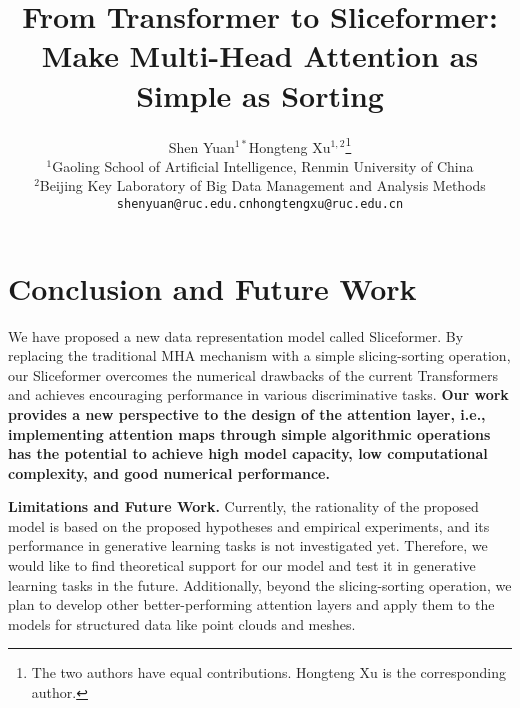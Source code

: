 \documentclass{article}
\title{From Transformer to Sliceformer: \\Make Multi-Head Attention as Simple as Sorting}
\author{Shen Yuan$^{1*}$\quad Hongteng Xu$^{1,2}$\thanks{The two authors have equal contributions. Hongteng Xu is the corresponding author.} \\
$^1$Gaoling School of Artificial Intelligence, Renmin University of China\\
$^2$Beijing Key Laboratory of Big Data Management and Analysis Methods\\
\texttt{shenyuan@ruc.edu.cn}\quad \texttt{hongtengxu@ruc.edu.cn}\\
}
\begin{document}
\maketitle











\section{Conclusion and Future Work}
We have proposed a new data representation model called Sliceformer. 
By replacing the traditional MHA mechanism with a simple slicing-sorting operation, our Sliceformer overcomes the numerical drawbacks of the current Transformers and achieves encouraging performance in various discriminative tasks. 
\textbf{Our work provides a new perspective to the design of the attention layer, i.e., implementing attention maps through simple algorithmic operations has the potential to achieve high model capacity, low computational complexity, and good numerical performance.} 

\textbf{Limitations and Future Work.} 
Currently, the rationality of the proposed model is based on the proposed hypotheses and empirical experiments, and its performance in generative learning tasks is not investigated yet.
Therefore, we would like to find theoretical support for our model and test it in generative learning tasks in the future.
Additionally, beyond the slicing-sorting operation, we plan to develop other better-performing attention layers and apply them to the models for structured data like point clouds and meshes.




\end{document}
